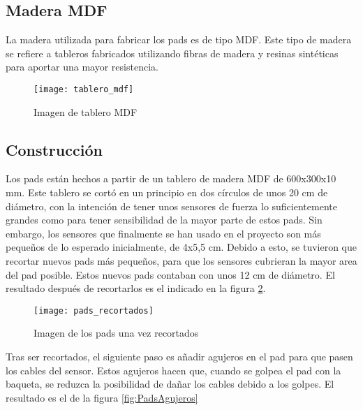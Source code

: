         \subsection{Madera MDF} %
        \label{sub:MaderaMDF}

            La madera utilizada para fabricar los pads es de tipo MDF. Este tipo de madera se refiere a tableros
            fabricados utilizando fibras de madera y resinas sintéticas para aportar una mayor
            resistencia.\cite{mdf_santana}

            \begin{figure}[ht]
                \centering
                \texttt{[image: tablero\_mdf]}
                \caption{Imagen de tablero MDF\label{fig:TableroMDF}}
            \end{figure}


        \subsection{Construcción} %
        \label{sub:ConstruccionPads}

            Los pads están hechos a partir de un tablero de madera MDF de 600x300x10 mm. Este tablero se cortó en un
            principio en dos círculos de unos 20 cm de diámetro, con la intención de tener unos sensores de fuerza lo
            suficientemente grandes como para tener sensibilidad de la mayor parte de estos pads. Sin embargo, los
            sensores que finalmente se han usado en el proyecto son más pequeños de lo esperado inicialmente, de
            4x5,5 cm. Debido a esto, se tuvieron que recortar nuevos pads más pequeños, para que los sensores cubrieran
            la mayor area del pad posible. Estos nuevos pads contaban con unos 12 cm de diámetro. El resultado después
            de recortarlos es el indicado en la figura \ref{fig:PadsRecortados}.

            \begin{figure}[ht]
                \centering
                \texttt{[image: pads\_recortados]}
                \caption{Imagen de los pads una vez recortados\label{fig:PadsRecortados}}
            \end{figure}
            
            \newpage

            Tras ser recortados, el siguiente paso es añadir agujeros en el pad para que pasen los cables del sensor.
            Estos agujeros hacen que, cuando se golpea el pad con la baqueta, se reduzca la posibilidad de dañar los
            cables debido a los golpes. El resultado es el de la figura \ref{fig:PadsAgujeros}

